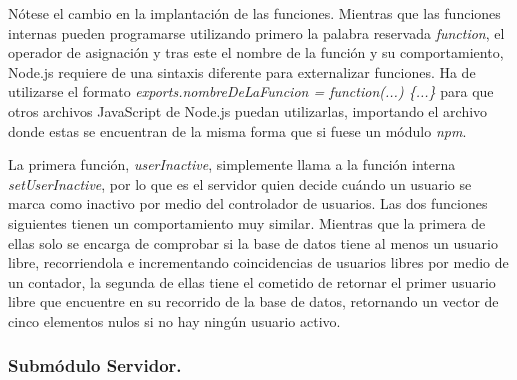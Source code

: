 
Nótese el cambio en la implantación de las funciones. Mientras que las funciones internas pueden programarse utilizando primero la palabra reservada \emph{function}, el operador de asignación y tras este el nombre de la función y su comportamiento, Node.js requiere de una sintaxis diferente para externalizar funciones. Ha de utilizarse el formato \emph{exports.nombreDeLaFuncion = function(...) \{...\}} para que otros archivos JavaScript de Node.js puedan utilizarlas, importando el archivo donde estas se encuentran de la misma forma que si fuese un módulo \emph{npm}.

La primera función, \emph{userInactive}, simplemente llama a la función interna \emph{setUserInactive}, por lo que es el servidor quien decide cuándo un usuario se marca como inactivo por medio del controlador de usuarios. Las dos funciones siguientes tienen un comportamiento muy similar. Mientras que la primera de ellas solo se encarga de comprobar si la base de datos tiene al menos un usuario libre, recorriendola e incrementando coincidencias de usuarios libres por medio de un contador, la segunda de ellas tiene el cometido de retornar el primer usuario libre que encuentre en su recorrido de la base de datos, retornando un vector de cinco elementos nulos si no hay ningún usuario activo.

\subsubsection{Submódulo Servidor.} \label{serverSubmodule}

